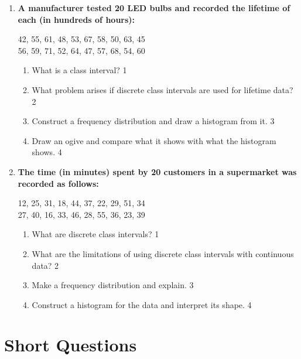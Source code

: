 \documentclass[a4paper,oneside]{book}
\begin{document}
\begin{enumerate}
\item
\textbf{A manufacturer tested 20 LED bulbs and recorded the lifetime of each (in hundreds of hours):}
\begin{center}
42, 55, 61, 48, 53, 67, 58, 50, 63, 45 \\
56, 59, 71, 52, 64, 47, 57, 68, 54, 60
\end{center}
\begin{enumerate}
  \item What is a class interval? \hfill 1
  \item What problem arises if discrete class intervals are used for lifetime data? \hfill 2
  \item Construct a frequency distribution and draw a histogram from it. \hfill 3
  \item Draw an ogive and compare what it shows with what the histogram shows. \hfill 4
\end{enumerate}

\item
\textbf{The time (in minutes) spent by 20 customers in a supermarket was recorded as follows:}
\begin{center}
12, 25, 31, 18, 44, 37, 22, 29, 51, 34 \\
27, 40, 16, 33, 46, 28, 55, 36, 23, 39
\end{center}
\begin{enumerate}
  \item What are discrete class intervals? \hfill 1
  \item What are the limitations of using discrete class intervals with continuous data? \hfill 2
  \item Make a frequency distribution and explain. \hfill 3
  \item Construct a histogram for the data and interpret its shape. \hfill 4
\end{enumerate}

\end{enumerate}
    
\section{Short Questions}
\end{document}
